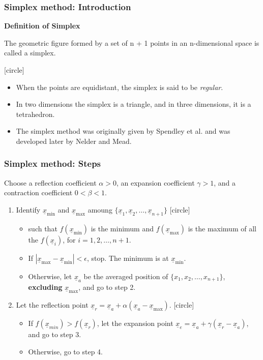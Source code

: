 \documentclass{beamer}
\begin{document}
\begin{frame}
    \frametitle{Simplex method: Introduction}
    \textbf{Definition of Simplex}

    The geometric figure formed by a set of n + 1 points in an
    n-dimensional space is called a simplex.

    [circle]
    \begin{itemize}
        \item When the points are equidistant, the simplex is said to be \textit{regular}.
        \item In two dimensions the simplex is a triangle, and in three dimensions, it is a tetrahedron.
        \item The simplex method was originally given by Spendley et al. and was developed later by Nelder and Mead.
    \end{itemize}    
\end{frame}

\begin{frame}
    \frametitle{Simplex method: Steps}
    Choose a reflection coefficient $\alpha>0$, an expansion coefficient $\gamma>1$, and a contraction coefficient $0<\beta<1$.
    \hfill \break
    \begin{enumerate}
        \item Identify $\underline{x}_{\min}$ and $\underline{x}_{\max}$ amoung
            $\{\underline{x}_1, \underline{x}_2,\dots,\underline{x}_{n+1}\}$
            [circle]
            \begin{itemize}
                \item such that $f(\underline{x}_{\min})$ is the minimum
                and $f(\underline{x}_{\max})$ is the maximum
                of all the $f(\underline{x}_i)$, for $i=1, 2, \dots,n+1$.
                \item If $|\underline{x}_{\max}-\underline{x}_{\min}|<\epsilon$, stop.
                The minimum is at $\underline{x}_{\min}$.
                \item Otherwise, let $\underline{x}_a$ be the averaged position of $\{x_1, x_2, \dots, x_{n+1}\}$,
                \textbf{excluding} $\underline{x}_{\max}$, and go to step 2.
            \end{itemize}
        \item Let the reflection point $\underline{x}_r=\underline{x}_a+\alpha (\underline{x}_a-\underline{x}_{\max})$.
        [circle]
        \begin{itemize}
            \item If $f(\underline{x}_{min})>f(\underline{x}_{r})$, let the expansion point $\underline{x}_e=\underline{x}_a+\gamma (\underline{x}_r-\underline{x}_a)$,
            and go to step 3.
            \item Otherwise, go to step 4.
        \end{itemize}
    \end{enumerate}
\end{frame}
\end{document}
